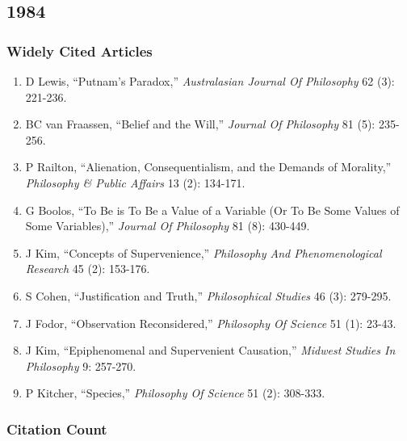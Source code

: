 \documentclass[
  10pt,
  letterpaper,
  DIV=11,
  numbers=noendperiod,
  twoside]{scrartcl}
\providecommand{\tightlist}{%
  \setlength{\itemsep}{0pt}\setlength{\parskip}{0pt}}\usepackage{longtable,booktabs,array}
\begin{document}
\newpage

\subsection{1984}\label{sec-s1984}

\subsubsection*{Widely Cited Articles}\label{widely-cited-articles-8}

\begin{enumerate}
\def\labelenumi{\arabic{enumi}.}
\tightlist
\item
  D Lewis, ``Putnam's Paradox,'' \emph{Australasian Journal Of
  Philosophy} 62 (3): 221-236.
\item
  BC van Fraassen, ``Belief and the Will,'' \emph{Journal Of Philosophy}
  81 (5): 235-256.
\item
  P Railton, ``Alienation, Consequentialism, and the Demands of
  Morality,'' \emph{Philosophy \& Public Affairs} 13 (2): 134-171.
\item
  G Boolos, ``To Be is To Be a Value of a Variable (Or To Be Some Values
  of Some Variables),'' \emph{Journal Of Philosophy} 81 (8): 430-449.
\item
  J Kim, ``Concepts of Supervenience,'' \emph{Philosophy And
  Phenomenological Research} 45 (2): 153-176.
\item
  S Cohen, ``Justification and Truth,'' \emph{Philosophical Studies} 46
  (3): 279-295.
\item
  J Fodor, ``Observation Reconsidered,'' \emph{Philosophy Of Science} 51
  (1): 23-43.
\item
  J Kim, ``Epiphenomenal and Supervenient Causation,'' \emph{Midwest
  Studies In Philosophy} 9: 257-270.
\item
  P Kitcher, ``Species,'' \emph{Philosophy Of Science} 51 (2): 308-333.
\end{enumerate}

\subsubsection*{Citation Count}\label{sec-count-1984}
\end{document}
